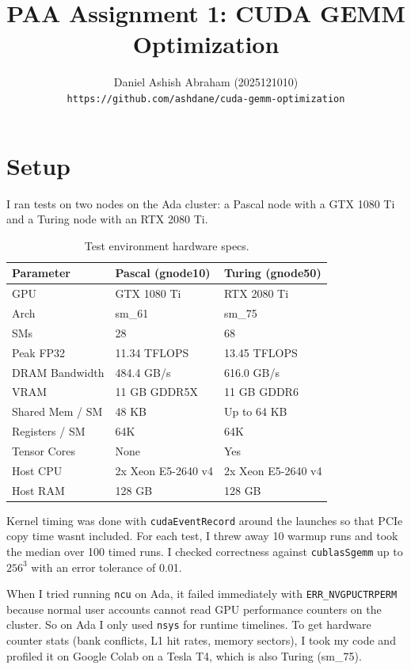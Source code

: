 \documentclass[11pt]{article}
\title{PAA Assignment 1: CUDA GEMM Optimization}
\author{Daniel Ashish Abraham (2025121010) \\
\texttt{https://github.com/ashdane/cuda-gemm-optimization}}
\date{}
\begin{document}
\maketitle

\section{Setup}

I ran tests on two nodes on the Ada cluster: a Pascal node with a GTX 1080 Ti and a Turing node with an RTX 2080 Ti.

\begin{table}[h]
\centering
\begin{tabular}{|l|l|l|}
\hline
\textbf{Parameter} & \textbf{Pascal (gnode10)} & \textbf{Turing (gnode50)} \\
\hline
GPU & GTX 1080 Ti & RTX 2080 Ti \\
Arch & sm\_61 & sm\_75 \\
SMs & 28 & 68 \\
Peak FP32 & 11.34 TFLOPS & 13.45 TFLOPS \\
DRAM Bandwidth & 484.4 GB/s & 616.0 GB/s \\
VRAM & 11 GB GDDR5X & 11 GB GDDR6 \\
Shared Mem / SM & 48 KB & Up to 64 KB \\
Registers / SM & 64K & 64K \\
Tensor Cores & None & Yes \\
Host CPU & 2x Xeon E5-2640 v4 & 2x Xeon E5-2640 v4 \\
Host RAM & 128 GB & 128 GB \\
\hline
\end{tabular}
\caption{Test environment hardware specs.}
\end{table}

Kernel timing was done with \texttt{cudaEventRecord} around the launches so that PCIe copy time wasnt included. For each test, I threw away 10 warmup runs and took the median over 100 timed runs. I checked correctness against \texttt{cublasSgemm} up to $256^3$ with an error tolerance of 0.01.

When I tried running \texttt{ncu} on Ada, it failed immediately with \texttt{ERR\_NVGPUCTRPERM} because normal user accounts cannot read GPU performance counters on the cluster. So on Ada I only used \texttt{nsys} for runtime timelines. To get hardware counter stats (bank conflicts, L1 hit rates, memory sectors), I took my code and profiled it on Google Colab on a Tesla T4, which is also Turing (sm\_75).
\end{document}
